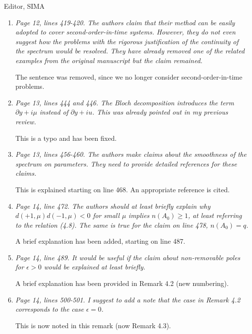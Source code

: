 \documentclass[11pt]{letter}
\begin{document}
\begin{letter}{Editor, SIMA}
\begin{enumerate}
\item \emph{Page 12, lines 419-420. The authors claim that their method can be easily adopted to cover second-order-in-time systems. However, they do not even suggest how the problems with the rigorous justification of the continuity of the spectrum would be resolved. They have already removed one of the related examples from the original manuscript but the claim remained.}
\vspace{4mm}

The sentence was removed, since we no longer consider second-order-in-time problems.

\item \emph{Page 13, lines 444 and 446. The Bloch decomposition introduces the term $\partial y + i \mu$ instead of $\partial y + i u$. This was already pointed out in my previous review.}
\vspace{4mm}

This is a typo and has been fixed.

\item \emph{Page 13, lines 456-460. The authors make claims about the smoothness of the spectrum on parameters. They need to provide detailed references for these claims.}
\vspace{4mm}

This is explained starting on line 468. An appropriate reference is cited.

\item \emph{Page 14, line 472. The authors should at least briefly explain why $d(+1,\mu)d(-1,\mu) < 0$ for small $\mu$ implies $n(A_0) \geq 1$, at least referring to the relation (4.8). The same is true for the claim on line 478, $n(A_0) = q$.}
\vspace{4mm}

A brief explanation has been added, starting on line 487.

\item \emph{Page 14, line 489. It would be useful if the claim about non-removable poles for $\epsilon > 0$ would be explained at least briefly.}
\vspace{4mm}

A brief explanation has been provided in Remark 4.2 (new numbering).

\item \emph{Page 14, lines 500-501. I suggest to add a note that the case in Remark 4.2 corresponds to the case $\epsilon = 0$.}
\vspace{4mm}

This is now noted in this remark (now Remark 4.3).


\end{enumerate}
\end{letter}
\end{document}
